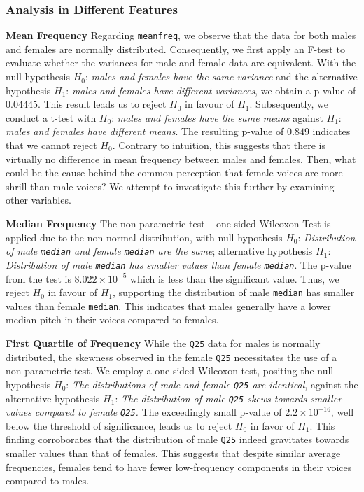 \documentclass{article}
\begin{document}
	\subsubsection{Analysis in Different Features}
	
	\textbf{Mean Frequency} Regarding \texttt{meanfreq}, we observe that the data for both males and females are normally distributed. Consequently, we first apply an F-test to evaluate whether the variances for male and female data are equivalent. With the null hypothesis $H_0$: \textit{males and females have the same variance} and the alternative hypothesis $H_1$: \textit{males and females have different variances}, we obtain a p-value of $0.04445$. This result leads us to reject $H_0$ in favour of $H_1$. Subsequently, we conduct a t-test with $H_0$: \textit{males and females have the same means} against $H_1$: \textit{males and females have different means}. The resulting p-value of $0.849$ indicates that we cannot reject $H_0$. Contrary to intuition, this suggests that there is virtually no difference in mean frequency between males and females. Then, what could be the cause behind the common perception that female voices are more shrill than male voices? We attempt to investigate this further by examining other variables.
	
	\textbf{Median Frequency} The non-parametric test -- one-sided Wilcoxon Test is applied due to the non-normal distribution, with null hypothesis $H_0$: \textit{Distribution of male \texttt{median} and female \texttt{median} are the same}; alternative hypothesis $H_1$: \textit{Distribution of male \texttt{median} has smaller values than female \texttt{median}}. The p-value from the test is $8.022\times 10^{-5}$ which is less than the significant value. Thus, we reject $H_0$ in favour of $H_1$, supporting the distribution of male \texttt{median} has smaller values than female \texttt{median}. This indicates that males generally have a lower median pitch in their voices compared to females.
	
	\textbf{First Quartile of Frequency} While the \texttt{Q25} data for males is normally distributed, the skewness observed in the female \texttt{Q25} necessitates the use of a non-parametric test. We employ a one-sided Wilcoxon test, positing the null hypothesis $H_0$: \textit{The distributions of male and female \texttt{Q25} are identical}, against the alternative hypothesis $H_1$: \textit{The distribution of male \texttt{Q25} skews towards smaller values compared to female \texttt{Q25}.} The exceedingly small p-value of $2.2\times 10^{-16}$, well below the threshold of significance, leads us to reject $H_0$ in favor of $H_1$. This finding corroborates that the distribution of male \texttt{Q25} indeed gravitates towards smaller values than that of females. This suggests that despite similar average frequencies, females tend to have fewer low-frequency components in their voices compared to males.
	
\end{document}
